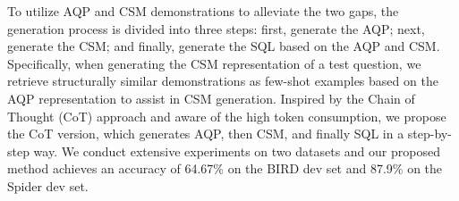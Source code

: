 To utilize AQP and CSM demonstrations to alleviate the two gaps, the generation process is divided into three steps: first, generate the AQP; next, generate the CSM; and finally, generate the SQL based on the AQP and CSM.
Specifically, when generating the CSM representation of a test question, we retrieve structurally similar demonstrations as few-shot examples based on the AQP representation to assist in CSM generation.
Inspired by the Chain of Thought (CoT) approach and aware of the high token consumption, we propose the CoT version, which generates AQP, then CSM, and finally SQL in a step-by-step way. 
We conduct extensive experiments on two datasets and our proposed method achieves an accuracy of 64.67\% on the BIRD dev set and 87.9\% on the Spider dev set.

